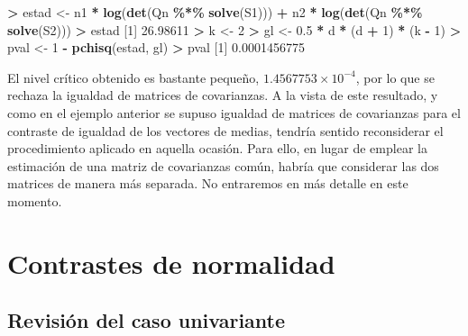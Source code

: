 \documentclass[
  a4paper,
  oneside]{scrbook}
\newenvironment{Shaded}{\begin{snugshade}}{\end{snugshade}}
\newcommand{\DecValTok}[1]{\textcolor[rgb]{0.00,0.00,0.81}{#1}}
\newcommand{\FloatTok}[1]{\textcolor[rgb]{0.00,0.00,0.81}{#1}}
\newcommand{\FunctionTok}[1]{\textcolor[rgb]{0.13,0.29,0.53}{\textbf{#1}}}
\newcommand{\NormalTok}[1]{#1}
\newcommand{\OtherTok}[1]{\textcolor[rgb]{0.56,0.35,0.01}{#1}}
\newcommand{\SpecialCharTok}[1]{\textcolor[rgb]{0.81,0.36,0.00}{\textbf{#1}}}
\theoremstyle{definition}
\theoremstyle{definition}
\theoremstyle{definition}
\theoremstyle{definition}
\theoremstyle{remark}
\begin{document}
\begin{Shaded}
\begin{Highlighting}[]
\SpecialCharTok{\textgreater{}}\NormalTok{ estad }\OtherTok{\textless{}{-}}\NormalTok{ n1 }\SpecialCharTok{*} \FunctionTok{log}\NormalTok{(}\FunctionTok{det}\NormalTok{(Qn }\SpecialCharTok{\%*\%} \FunctionTok{solve}\NormalTok{(S1))) }\SpecialCharTok{+}\NormalTok{ n2 }\SpecialCharTok{*} \FunctionTok{log}\NormalTok{(}\FunctionTok{det}\NormalTok{(Qn }\SpecialCharTok{\%*\%} \FunctionTok{solve}\NormalTok{(S2)))}
\SpecialCharTok{\textgreater{}}\NormalTok{ estad}
\NormalTok{[}\DecValTok{1}\NormalTok{] }\FloatTok{26.98611}
\SpecialCharTok{\textgreater{}}\NormalTok{ k }\OtherTok{\textless{}{-}} \DecValTok{2}
\SpecialCharTok{\textgreater{}}\NormalTok{ gl }\OtherTok{\textless{}{-}} \FloatTok{0.5} \SpecialCharTok{*}\NormalTok{ d }\SpecialCharTok{*}\NormalTok{ (d }\SpecialCharTok{+} \DecValTok{1}\NormalTok{) }\SpecialCharTok{*}\NormalTok{ (k }\SpecialCharTok{{-}} \DecValTok{1}\NormalTok{)}
\SpecialCharTok{\textgreater{}}\NormalTok{ pval }\OtherTok{\textless{}{-}} \DecValTok{1} \SpecialCharTok{{-}} \FunctionTok{pchisq}\NormalTok{(estad, gl)}
\SpecialCharTok{\textgreater{}}\NormalTok{ pval}
\NormalTok{[}\DecValTok{1}\NormalTok{] }\FloatTok{0.0001456775}
\end{Highlighting}
\end{Shaded}

\normalsize

El nivel crítico obtenido es bastante pequeño, \ensuremath{1.4567753\times 10^{-4}}, por lo que se
rechaza la igualdad de matrices de covarianzas. A la vista de este
resultado, y como en el ejemplo anterior se supuso igualdad de matrices
de covarianzas para el contraste de igualdad de los vectores de medias,
tendría sentido reconsiderar el procedimiento aplicado en aquella
ocasión. Para ello, en lugar de emplear la estimación de una matriz de
covarianzas común, habría que considerar las dos matrices de manera más
separada. No entraremos en más detalle en este momento.

\section{Contrastes de normalidad}\label{secnorm}

\subsection{Revisión del caso univariante}\label{secuni}
\end{document}
